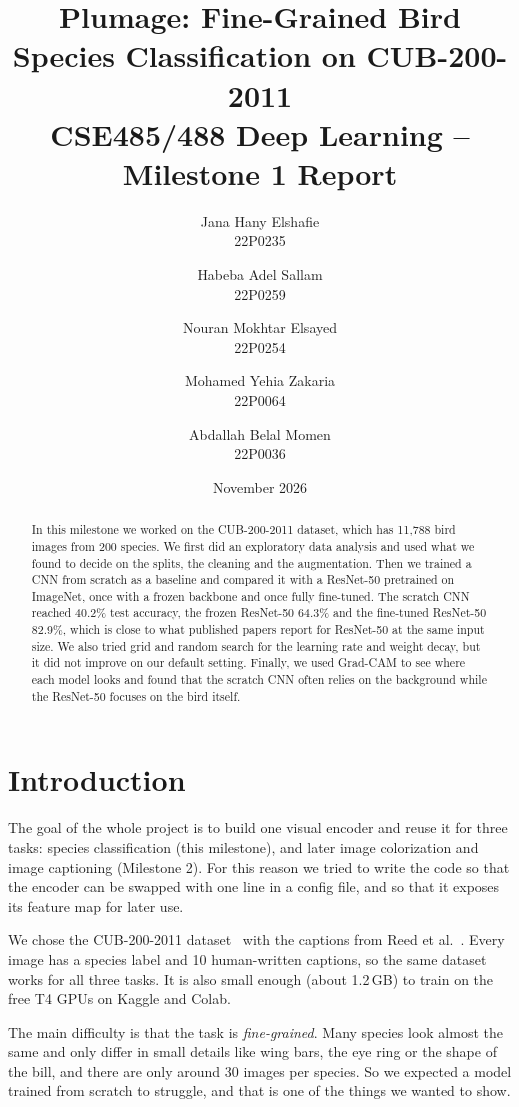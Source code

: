 \documentclass[11pt,a4paper]{article}
\title{\textbf{Plumage: Fine-Grained Bird Species Classification on CUB-200-2011}\\[4pt]
\large CSE485/488 Deep Learning -- Milestone 1 Report}
\author{
  Jana Hany Elshafie \\ \small 22P0235 \and
  Habeba Adel Sallam \\ \small 22P0259 \and
  Nouran Mokhtar Elsayed \\ \small 22P0254 \and
  Mohamed Yehia Zakaria \\ \small 22P0064 \and
  Abdallah Belal Momen \\ \small 22P0036
}
\date{November 2026}
\begin{document}
\maketitle

\begin{abstract}
In this milestone we worked on the CUB-200-2011 dataset, which has 11,788 bird images from 200 species. We first did an exploratory data analysis and used what we found to decide on the splits, the cleaning and the augmentation. Then we trained a CNN from scratch as a baseline and compared it with a ResNet-50 pretrained on ImageNet, once with a frozen backbone and once fully fine-tuned. The scratch CNN reached 40.2\% test accuracy, the frozen ResNet-50 64.3\% and the fine-tuned ResNet-50 82.9\%, which is close to what published papers report for ResNet-50 at the same input size. We also tried grid and random search for the learning rate and weight decay, but it did not improve on our default setting. Finally, we used Grad-CAM to see where each model looks and found that the scratch CNN often relies on the background while the ResNet-50 focuses on the bird itself.
\end{abstract}

\tableofcontents
\newpage

\section{Introduction}

The goal of the whole project is to build one visual encoder and reuse it for three tasks: species classification (this milestone), and later image colorization and image captioning (Milestone 2). For this reason we tried to write the code so that the encoder can be swapped with one line in a config file, and so that it exposes its feature map for later use.

We chose the CUB-200-2011 dataset~\cite{wah2011cub} with the captions from Reed et al.~\cite{reed2016}. Every image has a species label and 10 human-written captions, so the same dataset works for all three tasks. It is also small enough (about 1.2\,GB) to train on the free T4 GPUs on Kaggle and Colab.

The main difficulty is that the task is \emph{fine-grained}. Many species look almost the same and only differ in small details like wing bars, the eye ring or the shape of the bill, and there are only around 30 images per species. So we expected a model trained from scratch to struggle, and that is one of the things we wanted to show.
\end{document}
